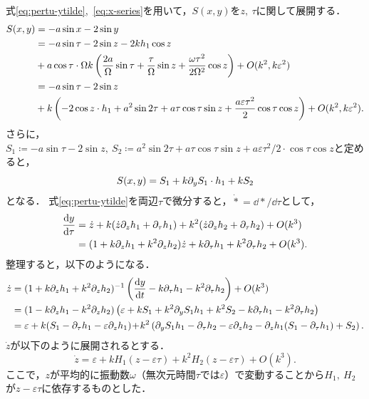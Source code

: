 \documentclass[../main]{subfiles}
\begin{document}
    式\eqref{eq:pertu-ytilde},\ \eqref{eq:x-series}を用いて，$S(x,y)$を$z,\ \tau$に関して展開する．
    \begin{align}
        S(x,y)&=-a\sin x-2\sin y\notag\\
        &=-a\sin\tau-2\sin z-2 kh_1\cos z\notag\\
        &+a\cos\tau\cdot \Omega k\left(\frac{2a}{\Omega}\sin\tau+\frac{\tau}{\Omega}\sin z+\frac{\omega \tau^2}{2\Omega^2}\cos z\right)+O(k^2,k\varepsilon^2)\notag\\
        &=-a\sin\tau-2\sin z\notag\\
        &+k\left(-2 \cos z\cdot h_1+a^2\sin 2\tau+a\tau\cos \tau\sin z+\frac{a\varepsilon \tau^2}{2}\cos \tau \cos z\right)+O(k^2,k\varepsilon^2).
    \end{align}
    さらに，$S_1\coloneqq-a\sin\tau-2\sin z,\ S_2\coloneqq a^2\sin 2\tau+a\tau\cos \tau\sin z+a\varepsilon \tau^2/2 \cdot\cos \tau \cos z$と定めると，
    \begin{equation}
        S(x,y)=S_1+k\partial_y S_1\cdot h_1+kS_2
    \end{equation}
    となる．
    式\eqref{eq:pertu-ytilde}を両辺$\tau$で微分すると，$\dot{\ast}=\dd{\ast}/\dd{\tau}$として，
    \begin{align}
        \dv{y}{\tau}&=\dot{z}+k(\dot{z}\partial_zh_1+\partial_\tau h_1)+k^2(\dot{z}\partial_zh_2+\partial_\tau h_2)+O(k^3)\notag\\
        &=(1+k\partial_zh_1+k^2\partial_zh_2)\dot{z}+k\partial_\tau h_1+k^2\partial_\tau h_2+O(k^3).
    \end{align}
    整理すると，以下のようになる．
    \begin{align}
        \dot{z}&=(1+k\partial_zh_1+k^2\partial_zh_2)^{-1}\left( \dv{y}{t}-k\partial_\tau h_1-k^2\partial_\tau h_2 \right)+O(k^3)\notag\\
        &=(1-k\partial_zh_1-k^2\partial_zh_2)\left(\varepsilon+kS_1+k^2 \partial_y S_1h_1+k^2S_2-k\partial_\tau h_1-k^2\partial_\tau h_2 \right)\notag\\
        &=\varepsilon+k(S_1-\partial_\tau h_1-\varepsilon\partial_zh_1)\!+\!k^2\left(\partial_y S_1h_1 -\partial_\tau h_2-\varepsilon\partial_zh_2 -\partial_zh_1(S_1-\partial_\tau h_1)+S_2\right).
    \end{align}
    $\dot{z}$が以下のように展開されるとする．
    \begin{equation}
        \dot{z}=\varepsilon+kH_1(z-\varepsilon \tau)+k^2H_2(z-\varepsilon \tau)+O(k^3).
    \end{equation}
    ここで，$z$が平均的に振動数$\omega$（無次元時間$\tau$では$\varepsilon$）で変動することから$H_1,\ H_2$が$z-\varepsilon \tau$に依存するものとした．
    
\end{document}
